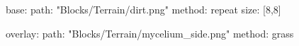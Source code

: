 base:
  path: "Blocks/Terrain/dirt.png"
  method: repeat
  size: [8,8]

overlay:
  path: "Blocks/Terrain/mycelium_side.png"
  method: grass